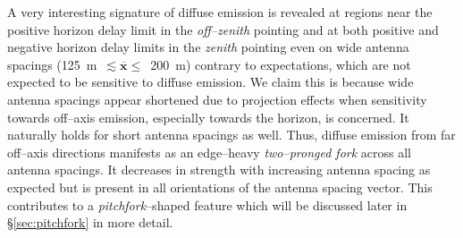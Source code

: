 \documentclass[preprint2,iop,numberedappendix]{emulateapj}
\begin{document}
A very interesting signature of diffuse emission is revealed at regions near the positive horizon delay limit in the {\it off--zenith} pointing and at both positive and negative horizon delay limits in the {\it zenith} pointing even on wide antenna spacings (125~m~$\lesssim \overline{\mathbf{x}}\le$~200~m) contrary to expectations, which are not expected to be sensitive to diffuse emission. We claim this is because wide antenna spacings appear shortened due to projection effects when sensitivity towards off--axis emission, especially towards the horizon, is concerned. It naturally holds for short antenna spacings as well. Thus, diffuse emission from far off--axis directions manifests as an edge--heavy {\it two--pronged fork} across all antenna spacings. It decreases in strength with increasing antenna spacing as expected but is present in all orientations of the antenna spacing vector. This contributes to a {\it pitchfork}--shaped feature which will be discussed later in \S\ref{sec:pitchfork} in more detail.


\end{document}
